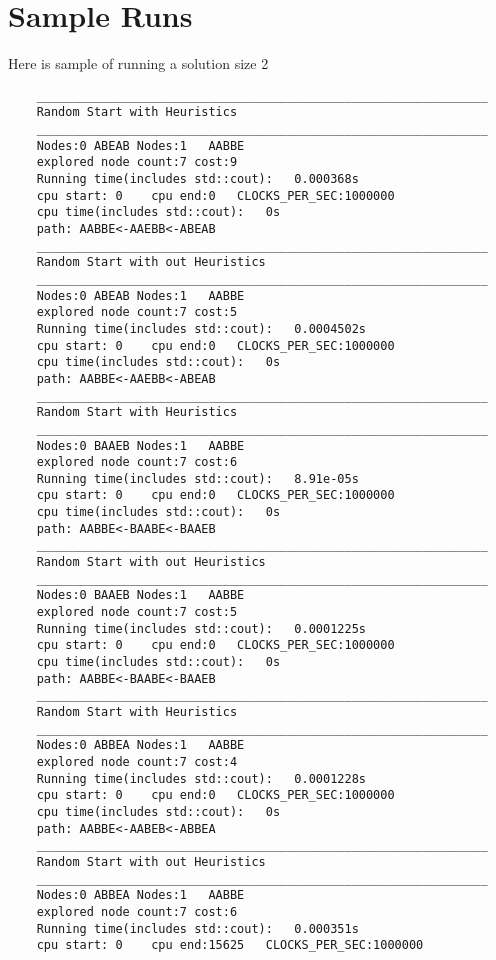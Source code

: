 \documentclass[12pt]{article}
\begin{document}
\section{Sample Runs}
Here is sample of running a solution size 2
\begin{lstlisting}
	_______________________________________________________________
	Random Start with Heuristics
	_______________________________________________________________
	Nodes:0	ABEAB Nodes:1	AABBE
	explored node count:7 cost:9
	Running time(includes std::cout):	0.000368s
	cpu start: 0	cpu end:0	CLOCKS_PER_SEC:1000000
	cpu time(includes std::cout):	0s
	path: AABBE<-AAEBB<-ABEAB
	_______________________________________________________________
	Random Start with out Heuristics
	_______________________________________________________________
	Nodes:0	ABEAB Nodes:1	AABBE
	explored node count:7 cost:5
	Running time(includes std::cout):	0.0004502s
	cpu start: 0	cpu end:0	CLOCKS_PER_SEC:1000000
	cpu time(includes std::cout):	0s
	path: AABBE<-AAEBB<-ABEAB
	_______________________________________________________________
	Random Start with Heuristics
	_______________________________________________________________
	Nodes:0	BAAEB Nodes:1	AABBE
	explored node count:7 cost:6
	Running time(includes std::cout):	8.91e-05s
	cpu start: 0	cpu end:0	CLOCKS_PER_SEC:1000000
	cpu time(includes std::cout):	0s
	path: AABBE<-BAABE<-BAAEB
	_______________________________________________________________
	Random Start with out Heuristics
	_______________________________________________________________
	Nodes:0	BAAEB Nodes:1	AABBE
	explored node count:7 cost:5
	Running time(includes std::cout):	0.0001225s
	cpu start: 0	cpu end:0	CLOCKS_PER_SEC:1000000
	cpu time(includes std::cout):	0s
	path: AABBE<-BAABE<-BAAEB
	_______________________________________________________________
	Random Start with Heuristics
	_______________________________________________________________
	Nodes:0	ABBEA Nodes:1	AABBE
	explored node count:7 cost:4
	Running time(includes std::cout):	0.0001228s
	cpu start: 0	cpu end:0	CLOCKS_PER_SEC:1000000
	cpu time(includes std::cout):	0s
	path: AABBE<-AABEB<-ABBEA
	_______________________________________________________________
	Random Start with out Heuristics
	_______________________________________________________________
	Nodes:0	ABBEA Nodes:1	AABBE
	explored node count:7 cost:6
	Running time(includes std::cout):	0.000351s
	cpu start: 0	cpu end:15625	CLOCKS_PER_SEC:1000000

\end{lstlisting}
\end{document}
